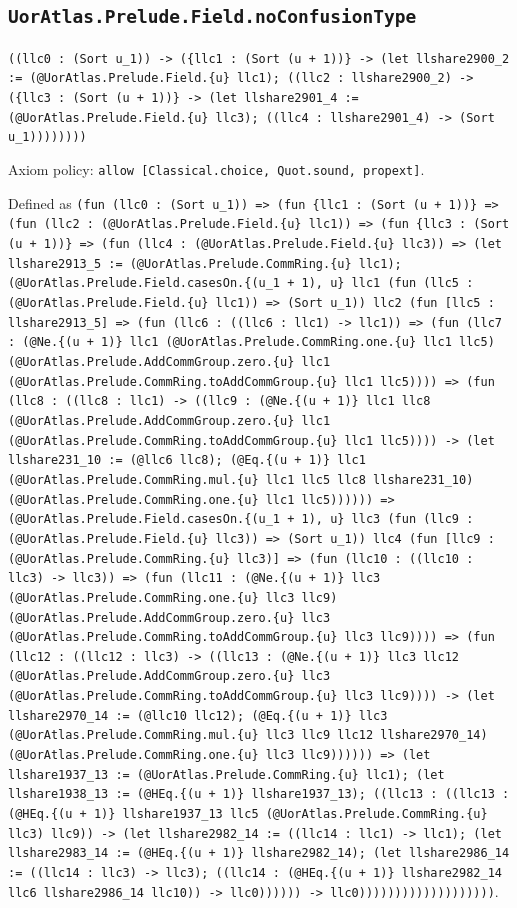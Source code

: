 \documentclass[11pt]{article}
\begin{document}
\subsection*{\texttt{UorAtlas.Prelude.Field.noConfusionType}}
\noindent\texttt{((llc0 : (Sort u\_1)) -> (\{llc1 : (Sort (u + 1))\} -> (let llshare2900\_2 := (@UorAtlas.Prelude.Field.\{u\} llc1); ((llc2 : llshare2900\_2) -> (\{llc3 : (Sort (u + 1))\} -> (let llshare2901\_4 := (@UorAtlas.Prelude.Field.\{u\} llc3); ((llc4 : llshare2901\_4) -> (Sort u\_1))))))))}\par
\noindent Axiom policy: \texttt{allow [Classical.choice, Quot.sound, propext]}.\par
\noindent Defined as \texttt{(fun (llc0 : (Sort u\_1)) => (fun \{llc1 : (Sort (u + 1))\} => (fun (llc2 : (@UorAtlas.Prelude.Field.\{u\} llc1)) => (fun \{llc3 : (Sort (u + 1))\} => (fun (llc4 : (@UorAtlas.Prelude.Field.\{u\} llc3)) => (let llshare2913\_5 := (@UorAtlas.Prelude.CommRing.\{u\} llc1); (@UorAtlas.Prelude.Field.casesOn.\{(u\_1 + 1), u\} llc1 (fun (llc5 : (@UorAtlas.Prelude.Field.\{u\} llc1)) => (Sort u\_1)) llc2 (fun [llc5 : llshare2913\_5] => (fun (llc6 : ((llc6 : llc1) -> llc1)) => (fun (llc7 : (@Ne.\{(u + 1)\} llc1 (@UorAtlas.Prelude.CommRing.one.\{u\} llc1 llc5) (@UorAtlas.Prelude.AddCommGroup.zero.\{u\} llc1 (@UorAtlas.Prelude.CommRing.toAddCommGroup.\{u\} llc1 llc5)))) => (fun (llc8 : ((llc8 : llc1) -> ((llc9 : (@Ne.\{(u + 1)\} llc1 llc8 (@UorAtlas.Prelude.AddCommGroup.zero.\{u\} llc1 (@UorAtlas.Prelude.CommRing.toAddCommGroup.\{u\} llc1 llc5)))) -> (let llshare231\_10 := (@llc6 llc8); (@Eq.\{(u + 1)\} llc1 (@UorAtlas.Prelude.CommRing.mul.\{u\} llc1 llc5 llc8 llshare231\_10) (@UorAtlas.Prelude.CommRing.one.\{u\} llc1 llc5)))))) => (@UorAtlas.Prelude.Field.casesOn.\{(u\_1 + 1), u\} llc3 (fun (llc9 : (@UorAtlas.Prelude.Field.\{u\} llc3)) => (Sort u\_1)) llc4 (fun [llc9 : (@UorAtlas.Prelude.CommRing.\{u\} llc3)] => (fun (llc10 : ((llc10 : llc3) -> llc3)) => (fun (llc11 : (@Ne.\{(u + 1)\} llc3 (@UorAtlas.Prelude.CommRing.one.\{u\} llc3 llc9) (@UorAtlas.Prelude.AddCommGroup.zero.\{u\} llc3 (@UorAtlas.Prelude.CommRing.toAddCommGroup.\{u\} llc3 llc9)))) => (fun (llc12 : ((llc12 : llc3) -> ((llc13 : (@Ne.\{(u + 1)\} llc3 llc12 (@UorAtlas.Prelude.AddCommGroup.zero.\{u\} llc3 (@UorAtlas.Prelude.CommRing.toAddCommGroup.\{u\} llc3 llc9)))) -> (let llshare2970\_14 := (@llc10 llc12); (@Eq.\{(u + 1)\} llc3 (@UorAtlas.Prelude.CommRing.mul.\{u\} llc3 llc9 llc12 llshare2970\_14) (@UorAtlas.Prelude.CommRing.one.\{u\} llc3 llc9)))))) => (let llshare1937\_13 := (@UorAtlas.Prelude.CommRing.\{u\} llc1); (let llshare1938\_13 := (@HEq.\{(u + 1)\} llshare1937\_13); ((llc13 : ((llc13 : (@HEq.\{(u + 1)\} llshare1937\_13 llc5 (@UorAtlas.Prelude.CommRing.\{u\} llc3) llc9)) -> (let llshare2982\_14 := ((llc14 : llc1) -> llc1); (let llshare2983\_14 := (@HEq.\{(u + 1)\} llshare2982\_14); (let llshare2986\_14 := ((llc14 : llc3) -> llc3); ((llc14 : (@HEq.\{(u + 1)\} llshare2982\_14 llc6 llshare2986\_14 llc10)) -> llc0)))))) -> llc0)))))))))))))))))))}.\par
\end{document}

